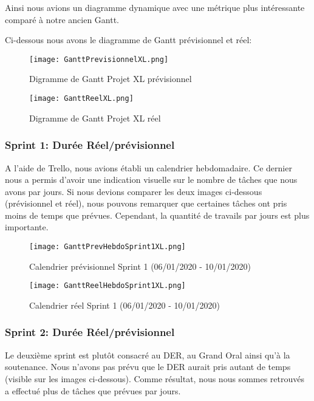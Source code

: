 Ainsi nous avions un diagramme dynamique avec une métrique plus intéressante comparé à notre ancien Gantt.

Ci-dessous nous avons le diagramme de Gantt prévisionnel et réel: 

\begin{figure}[h!]
  \centering
  \texttt{[image: GanttPrevisionnelXL.png]}
	\caption[]{Digramme de Gantt Projet XL prévisionnel}
	\label{}
\end{figure}

\begin{figure}[h!]
  \centering
  \texttt{[image: GanttReelXL.png]}
	\caption[]{Digramme de Gantt Projet XL réel}
	\label{}
\end{figure}


\subsubsection{Sprint 1: Durée Réel/prévisionnel}
A l'aide de Trello, nous avions établi un calendrier hebdomadaire.
Ce dernier nous a permis d’avoir une indication visuelle sur le nombre de tâches que nous avons par jours.
Si nous devions comparer les deux images ci-dessous (prévisionnel et réel), nous pouvons remarquer que certaines tâches ont pris moins de temps que prévues.
Cependant, la quantité de travails par jours est plus importante.

\begin{figure}[h!]
  \centering
  \texttt{[image: GanttPrevHebdoSprint1XL.png]}
	\caption[]{Calendrier prévisionnel Sprint 1 (06/01/2020 - 10/01/2020)}
	\label{}
\end{figure}

\begin{figure}[h!]
  \centering
  \texttt{[image: GanttReelHebdoSprint1XL.png]}
	\caption[]{Calendrier réel Sprint 1 (06/01/2020 - 10/01/2020)}
	\label{}
\end{figure}



\subsubsection{Sprint 2: Durée Réel/prévisionnel}
Le deuxième sprint est plutôt consacré au DER, au Grand Oral ainsi qu'à la soutenance.
Nous n'avons pas prévu que le DER aurait pris autant de temps (visible sur les images ci-dessous).
Comme résultat, nous nous sommes retrouvés a effectué plus de tâches que prévues par jours. 

